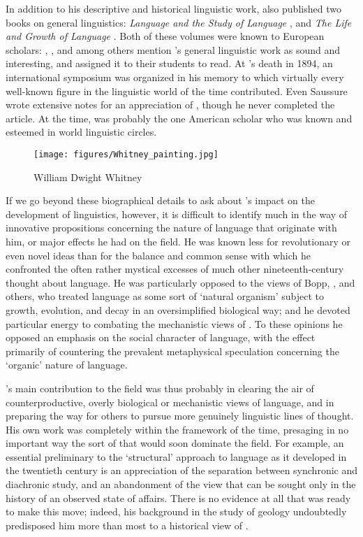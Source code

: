 In addition to his descriptive and historical linguistic work, {\Whitney}
also published two books on general linguistics: \textsl{Language and
  the Study of Language} \citep{whitney67:language}, and \textsl{The
  Life and Growth of Language} \citep{whitney75:life.and.growth}. Both
of these volumes were known to European scholars: {\DeCourtenay}, {\Saussure}, and {\Fortunatov} among others mention {\Whitney}'s
general linguistic work as sound and interesting, and assigned it to
their students to read. At {\Whitney}'s death in 1894, an international
symposium was organized in his memory to which virtually every
well-known figure in the linguistic world of the time
contributed. Even Saussure wrote extensive notes for an appreciation
of {\Whitney}, though he never completed the article. At the time,
{\Whitney} was probably the one American scholar who was known and
esteemed in world linguistic circles.

\begin{wrapfigure}{r}{.35\textwidth}
  \texttt{[image: figures/Whitney\_painting.jpg]}
  \caption{William Dwight Whitney}
  \label{fig:ch.boas.whitney_painting}
\end{wrapfigure}
If we go beyond these biographical details to ask about {\Whitney}'s
impact on the development of linguistics, however, it is difficult to
identify much in the way of innovative propositions concerning the
nature of language that originate with him, or major effects he had on
the field. He was known less for revolutionary or even novel ideas
than for the balance and common sense with which he confronted the
often rather mystical excesses of much other nineteenth-century
thought about language. He was particularly opposed to the views of
Bopp, {\Schleicher}, and others, who treated language as some sort of
`natural organism' subject to growth, evolution, and decay in an
oversimplified biological way; and he devoted particular energy to
combating the mechanistic views of . To these opinions he
opposed an emphasis on the social character of language, with the
effect primarily of countering the prevalent metaphysical speculation
concerning the `organic' nature of language.

{\Whitney}'s main contribution to the field was thus probably in clearing
the air of counterproductive, overly biological or mechanistic views
of language, and in preparing the way for others to pursue more
genuinely linguistic lines of thought. His own work was completely
within the framework of the time, presaging in no important way the
sort of  that would soon dominate the field. For example,
an essential preliminary to the `structural' approach to language as
it developed in the twentieth century is an appreciation of the
separation between synchronic and diachronic study, and an abandonment
of the view that  can be sought only in the history of an
observed state of affairs. There is no evidence at all that {\Whitney}
was ready to make this move; indeed, his background in the study of
geology undoubtedly predisposed him more than most to a historical
view of .

